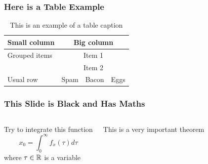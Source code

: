 \documentclass[fleqn]{qu-slides}
\begin{document}

\SlideWhite
\begin{frame}
    \frametitle{Here is a Table Example}
    \begin{table}
        \caption{This is an example of a table caption}
        \flushleft
        \begin{tabular}{lccc}
            \toprule
                \bf Small column & \multicolumn{3}{c}{\bf Big column} \\
            \midrule
                Grouped items & \multicolumn{3}{c}{Item 1} \\
            \cmidrule{2-4}
                & \multicolumn{3}{c}{Item 2} \\
            \midrule
                Usual row & Spam & Bacon & Eggs \\
            \bottomrule
        \end{tabular}
    \end{table}
\end{frame}




\SlideBlack
\begin{frame}
    \frametitle{This Slide is Black and Has Maths}
    \begin{columns}
        Try to integrate this function
        \begin{equation*}
            x_0=\int_0^\infty f_x(\tau)d\tau
        \end{equation*}
        where $\tau\in\mathbb R$ is a variable
        \begin{thm}
            This is a very important theorem
        \end{thm}
    \end{columns}
\end{frame}

\end{document}
